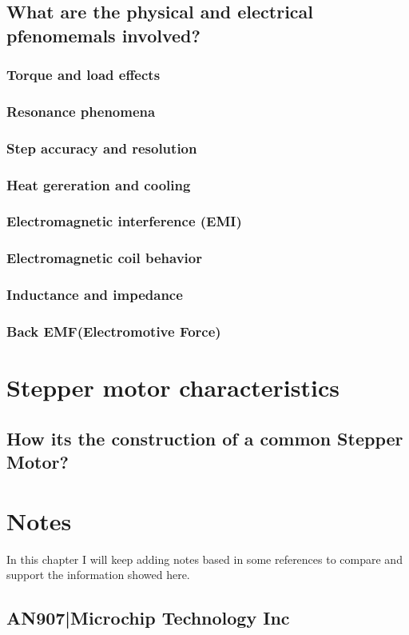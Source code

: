\documentclass{report}
\begin{document}
\section{What are the physical and electrical pfenomemals involved?}
\subsection{Torque and load effects}
\subsection{Resonance phenomena}
\subsection{Step accuracy and resolution}
\subsection{Heat gereration and cooling}
\subsection{Electromagnetic interference (EMI)}
\subsection{Electromagnetic coil behavior}
\subsection{Inductance and impedance}
\subsection{Back EMF(Electromotive Force)}
\chapter{Stepper motor characteristics}
\section{How its the construction of a common Stepper Motor?}
\chapter{Notes}
In this chapter I will keep adding notes based in some references to compare and support the information 
showed here.
\section{AN907|Microchip Technology Inc}
\end{document}
